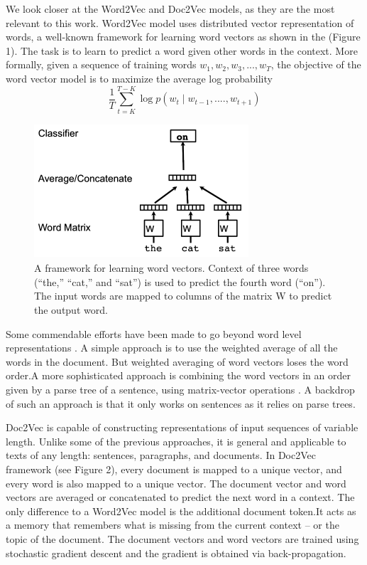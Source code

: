 \documentclass[12pt,a4paper] {article}
\begin{document}
We look closer at the Word2Vec and Doc2Vec models, as they are the most relevant to this work. Word2Vec model uses distributed vector representation of words, a well-known framework for learning word vectors as shown in the (Figure 1). The task is to learn to predict a word given other words in the context.
More formally, given a sequence of training words
$w_{1}, w_{2}, w_{3}, ..., w_{T} $, the objective of the word vector model is to maximize the average log probability
\\
\begin{equation}
\frac{1}{T} \sum_{t=K}^{T-K} \log p(w_{t} \mid w_{t-1},....,w_{t+1}) 
\end{equation}

	\begin{figure}[h]
		\centering
		\includegraphics[width=8cm, height=5cm]{w2v.png}
		\caption[]{A framework for learning word vectors. Context of
			three words (“the,” “cat,” and “sat”) is used to predict the fourth
			word (“on”). The input words are mapped to columns of the matrix
			W to predict the output word.}
		\label{fig:Word2Vec model}
	\end{figure}
Some commendable efforts have been made to go beyond word level representations  \cite{mitchell2010composition}  \cite{zanzotto2010estimating} 
\cite{yessenalina2011compositional}  \cite{grefenstette2013multi}  \cite{mikolov2013distributed}. A simple approach is to use the weighted average of all the words in the document. But weighted averaging of word vectors loses the word order.A more sophisticated approach is combining the word vectors
in an order given by a parse tree of a sentence, using
matrix-vector operations \cite{socher2011dynamic}. A backdrop of such an approach is that it only works on sentences as it relies on parse trees.

Doc2Vec is capable of constructing representations
of input sequences of variable length. Unlike some of the
previous approaches, it is general and applicable to texts of
any length: sentences, paragraphs, and documents. In Doc2Vec framework (see Figure 2), every
document is mapped to a unique vector, and every word is also mapped to a
unique vector. The document vector and word vectors are averaged or concatenated
to predict the next word in a context. The only difference to a Word2Vec model is the additional document token.It
acts as a memory that remembers what is missing from the
current context – or the topic of the document. The document vectors and word vectors are trained using stochastic gradient descent and the gradient is obtained via back-propagation.
\end{document}
